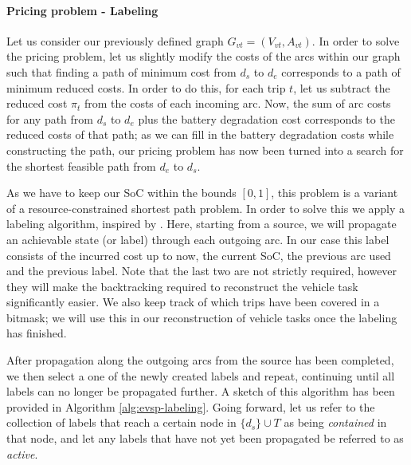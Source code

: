 \documentclass[]{article}
\begin{document}
\paragraph{Pricing problem - Labeling} \label{sec:labeling-evsp}
Let us consider our previously defined graph $G_{vt} = (V_{vt}, A_{vt})$. In order to solve the pricing problem, let us slightly modify the costs of the arcs within our graph such that finding a path of minimum cost from $d_s$ to $d_e$ corresponds to a path of minimum reduced costs. In order to do this, for each trip $t$, let us subtract the reduced cost $\pi_t$ from the costs of each incoming arc. Now, the sum of arc costs for any path from $d_s$ to $d_e$ plus the battery degradation cost corresponds to the reduced costs of that path; as we can fill in the battery degradation costs while constructing the path, our pricing problem has now been turned into a search for the shortest feasible path from $d_e$ to $d_s$.

As we have to keep our SoC within the bounds $[0, 1]$, this problem is a variant of a resource-constrained shortest path problem. In order to solve this we apply a labeling algorithm, inspired by \citet{Huang2016}. Here, starting from a source, we will propagate an achievable state (or label) through each outgoing arc. In our case this label consists of the incurred cost up to now, the current SoC, the previous arc used and the previous label. Note that the last two are not strictly required, however they will make the backtracking required to reconstruct the vehicle task significantly easier. We also keep track of which trips have been covered in a bitmask; we will use this in our reconstruction of vehicle tasks once the labeling has finished. 

After propagation along the outgoing arcs from the source has been completed, we then select a one of the newly created labels and repeat, continuing until all labels can no longer be propagated further. A sketch of this algorithm has been provided in Algorithm \ref{alg:evsp-labeling}. Going forward, let us refer to the collection of labels that reach a certain node in $\{ d_s \} \cup T$ as being \textit{contained} in that node, and let any labels that have not yet been propagated be referred to as \emph{active}. 
\end{document}
